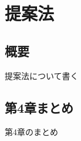 \documentclass[./_thesis]{subfiles}
\begin{document}
\chapter{提案法}
\section{概要}
\begin{spacing}{2.0}
提案法について書く

\section{第4章まとめ}
第4章のまとめ

\end{spacing}
\end{document}
